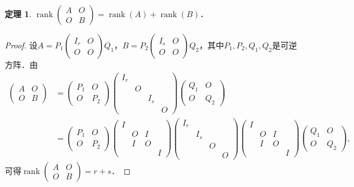 \documentclass[a4paper,fontset=windows]{ctexbook}
\newtheorem{theorem}{定理}[chapter]
\theoremstyle{definition}
\DeclareMathOperator{\rank}{rank}
\begin{document}
\begin{theorem}
$\rank\begin{pmatrix}A&O \\ O&B\end{pmatrix}=\rank(A)+\rank(B)$．
\end{theorem}

\begin{proof}
设$A=P_1\begin{pmatrix}I_r&O \\ O&O\end{pmatrix}Q_1$，$B=P_2\begin{pmatrix}I_s&O \\ O&O\end{pmatrix}Q_2$，其中$P_1,P_2,Q_1,Q_2$是可逆方阵．由
\begin{align*}
\begin{pmatrix}A&O \\ O&B\end{pmatrix}&=\begin{pmatrix}P_1&O \\ O&P_2\end{pmatrix}\left(\begin{smallmatrix}I_r&&& \\ &O&& \\ &&I_s& \\ &&&O\end{smallmatrix}\right)\begin{pmatrix}Q_1&O \\ O&Q_2\end{pmatrix} \\
&=\begin{pmatrix}P_1&O \\ O&P_2\end{pmatrix}\left(\begin{smallmatrix}I&&& \\ &O&I& \\ &I&O& \\ &&&I\end{smallmatrix}\right)\left(\begin{smallmatrix}I_r&&& \\ &I_s&& \\ &&O& \\ &&&O\end{smallmatrix}\right)\left(\begin{smallmatrix}I&&& \\ &O&I& \\ &I&O& \\ &&&I\end{smallmatrix}\right)\begin{pmatrix}Q_1&O \\ O&Q_2\end{pmatrix},
\end{align*}
可得$\rank\begin{pmatrix}A&O \\ O&B\end{pmatrix}=r+s$．
\end{proof}
\end{document}
